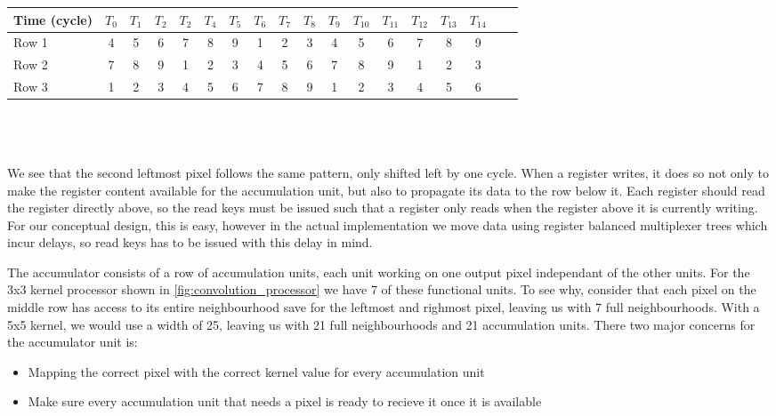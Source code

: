 \begin{tabular}{l*{16}{c}r}
    Time (cycle)        & $T_{0}$ & $T_{1}$ & $T_{2}$ & $T_{2}$ & $T_{4}$  & $T_{5}$ & $T_{6}$ & $T_{7}$ & $T_{8}$ & $T_{9}$ & $T_{10}$ & $T_{11}$ & $T_{12}$ & $T_{13}$ & $T_{14}$\\
\hline
Row 1                   & \cellcolor{gray75} 4 & 5 & 6 & 7 & 8 & 9 & 1 & \cellcolor{gray75} 2 & \cellcolor{gray75} 3 & 4\cellcolor{gray75} & 5 & 6 & 7 & 8 & 9 & \\
Row 2                   & 7 & 8 & 9 & 1 & \cellcolor{gray75} 2 & \cellcolor{gray75} 3 & \cellcolor{gray75}4 & 5 & 6 & 7 & 8 & 9 & 1 & \cellcolor{gray75} 2 & \cellcolor{gray75} 3 & \\
Row 3                   & 1 & \cellcolor{gray75} 2 & \cellcolor{gray75} 3 & 4\cellcolor{gray75} & 5 & 6 & 7 & 8 & 9 & 1 & \cellcolor{gray75} 2 & \cellcolor{gray75} 3 & 4\cellcolor{gray75} & 5 & 6 & \\
\end{tabular}\\ \\ \\
We see that the second leftmost pixel follows the same pattern, only shifted left by one cycle.
When a register writes, it does so not only to make the register content available for the accumulation unit, but also to propagate its data to the row below it.
Each register should read the register directly above, so the read keys must be issued such that a register only reads when the register above it is currently writing.
For our conceptual design, this is easy, however in the actual implementation we move data using register balanced multiplexer trees which incur delays, so read keys has to be issued with this delay in mind.

The accumulator consists of a row of accumulation units, each unit working on one output pixel independant of the other units.
For the 3x3 kernel processor shown in \ref{fig:convolution_processor} we have 7 of these functional units.
To see why, consider that each pixel on the middle row has access to its entire neighbourhood save for the leftmost and righmost pixel, leaving us with 7 full neighbourhoods.
With a 5x5 kernel, we would use a width of 25, leaving us with 21 full neighbourhoods and 21 accumulation units.
There two major concerns for the accumulator unit is:
\begin{itemize}
    \item Mapping the correct pixel with the correct kernel value for every accumulation unit
    \item Make sure every accumulation unit that needs a pixel is ready to recieve it once it is available
\end{itemize}


